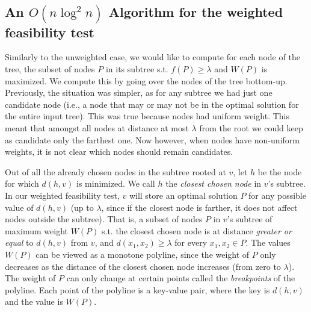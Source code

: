 \documentclass[11pt,a4paper]{article}
\theoremstyle{definition}
\theoremstyle{remark}
\begin{document}
\subsection{An \boldmath$O(n \log ^2 n)$ Algorithm for the weighted feasibility test}
Similarly to the unweighted case, we would like to compute for each node of the tree, the subset of nodes $P$ in its subtree  s.t. $f(P) \geq \lambda$ and $W(P)$ is maximized. We compute this by going over the nodes of the tree bottom-up. Previously, the situation was simpler, as for any subtree we had just one candidate node (i.e., a node that may or may not be in the optimal solution for the entire input tree). This was true because nodes had uniform weight. This meant that amongst all nodes at distance at most $\lambda$ from the root we could keep as candidate only the farthest one. Now however, when nodes have non-uniform weights, it is not clear which nodes should remain candidates. 


Out of all the already chosen nodes in the subtree rooted at $v$, let $h$ be the node for which $d(h,v)$ is minimized. We call $h$ the {\em closest chosen node} in $v$'s subtree. In our weighted feasibility test, $v$ will store an optimal solution $P$ for any possible value of $d(h,v)$ (up to $\lambda$, since if the closest node is farther, it does not affect nodes outside the subtree). That is, a subset of nodes $P$ in $v$'s subtree of maximum weight $W(P)$ s.t. the closest chosen node is at distance {\em greater or equal} to $d(h,v)$ from $v$, and $d(x_1,x_2) \geq \lambda$ for every  $x_1,x_2\in P$. 
The values $W(P)$ can be viewed as a monotone polyline, since the weight of $P$ only decreases as the distance of the closest chosen node increases (from zero to $\lambda$). The weight of $P$ can only change at certain points called the {\em breakpoints} of the polyline. Each point of the polyline is a key-value pair, where the key is $d(h,v)$ and the value is $W(P)$.
\end{document}
